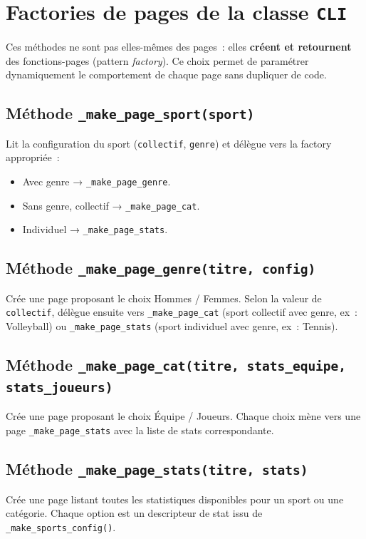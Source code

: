 \documentclass[12pt,a4paper]{article}
\begin{document}
\section{Factories de pages de la classe \texttt{CLI}}

Ces méthodes ne sont pas elles-mêmes des pages~: elles \textbf{créent
et retournent} des fonctions-pages (pattern \textit{factory}). Ce
choix permet de paramétrer dynamiquement le comportement de chaque
page sans dupliquer de code.

\subsection{Méthode \texttt{\_make\_page\_sport(sport)}}
Lit la configuration du sport (\texttt{collectif}, \texttt{genre}) et
délègue vers la factory appropriée~:
\begin{itemize}
    \item Avec genre → \texttt{\_make\_page\_genre}.
    \item Sans genre, collectif → \texttt{\_make\_page\_cat}.
    \item Individuel → \texttt{\_make\_page\_stats}.
\end{itemize}

\subsection{Méthode \texttt{\_make\_page\_genre(titre, config)}}
Crée une page proposant le choix Hommes / Femmes. Selon la valeur de
\texttt{collectif}, délègue ensuite vers \texttt{\_make\_page\_cat}
(sport collectif avec genre, ex~: Volleyball) ou
\texttt{\_make\_page\_stats} (sport individuel avec genre, ex~: Tennis).

\subsection{Méthode \texttt{\_make\_page\_cat(titre, stats\_equipe, stats\_joueurs)}}
Crée une page proposant le choix Équipe / Joueurs. Chaque choix mène
vers une page \texttt{\_make\_page\_stats} avec la liste de stats
correspondante.

\subsection{Méthode \texttt{\_make\_page\_stats(titre, stats)}}
Crée une page listant toutes les statistiques disponibles pour un sport
ou une catégorie. Chaque option est un descripteur de stat issu de
\texttt{\_make\_sports\_config()}.
\end{document}
